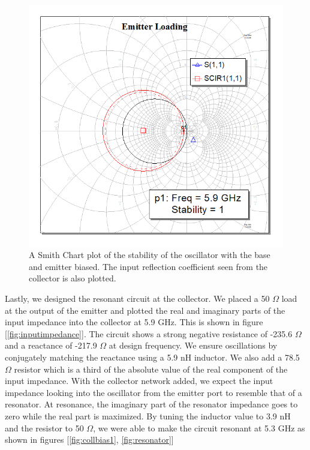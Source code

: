 \documentclass{article}
\begin{document}
\begin{figure}[!htbp]
    \centering
    \includegraphics[scale=0.4]{emitter_loading.png}
    \caption{A Smith Chart plot of the stability of the oscillator with the base and emitter biased. The input reflection coefficient seen from the collector is also plotted.}
    \label{fig:emitterloading}
\end{figure}

Lastly, we designed the resonant circuit at the collector. We placed a 50 $\Omega$ load at the output of the emitter and plotted the real and imaginary parts of the input impedance into the collector at 5.9 GHz. This is shown in figure [\ref{fig:inputimpedance}]. The circuit shows a strong negative resistance of -235.6 $\Omega$ and a reactance of -217.9 $\Omega$ at design frequency. We ensure oscillations by conjugately matching the reactance using a 5.9 nH inductor. We also add a 78.5 $\Omega$ resistor which is a third of the absolute value of the real component of the input impedance. With the collector network added, we expect the input impedance looking into the oscillator from the emitter port to resemble that of a resonator. At resonance, the imaginary part of the resonator impedance goes to zero while the real part is maximized. By tuning the inductor value to 3.9 nH and the resistor to 50 $\Omega$, we were able to make the circuit resonant at 5.3 GHz as shown in figures [\ref{fig:collbias1}, \ref{fig:resonator}]
 
\end{document}
